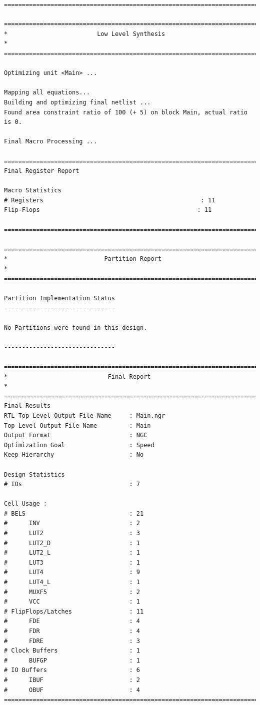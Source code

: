 \documentclass[fleqn]{article}
\begin{document}
\begin{latin}
\begin{lstlisting}[basicstyle=\tiny]
=========================================================================

=========================================================================
*                         Low Level Synthesis                           *
=========================================================================

Optimizing unit <Main> ...

Mapping all equations...
Building and optimizing final netlist ...
Found area constraint ratio of 100 (+ 5) on block Main, actual ratio is 0.

Final Macro Processing ...

=========================================================================
Final Register Report

Macro Statistics
# Registers                                            : 11
Flip-Flops                                            : 11

=========================================================================

=========================================================================
*                           Partition Report                            *
=========================================================================

Partition Implementation Status
-------------------------------

No Partitions were found in this design.

-------------------------------

=========================================================================
*                            Final Report                               *
=========================================================================
Final Results
RTL Top Level Output File Name     : Main.ngr
Top Level Output File Name         : Main
Output Format                      : NGC
Optimization Goal                  : Speed
Keep Hierarchy                     : No

Design Statistics
# IOs                              : 7

Cell Usage :
# BELS                             : 21
#      INV                         : 2
#      LUT2                        : 3
#      LUT2_D                      : 1
#      LUT2_L                      : 1
#      LUT3                        : 1
#      LUT4                        : 9
#      LUT4_L                      : 1
#      MUXF5                       : 2
#      VCC                         : 1
# FlipFlops/Latches                : 11
#      FDE                         : 4
#      FDR                         : 4
#      FDRE                        : 3
# Clock Buffers                    : 1
#      BUFGP                       : 1
# IO Buffers                       : 6
#      IBUF                        : 2
#      OBUF                        : 4
=========================================================================


\end{lstlisting}
\end{latin}
\end{document}
